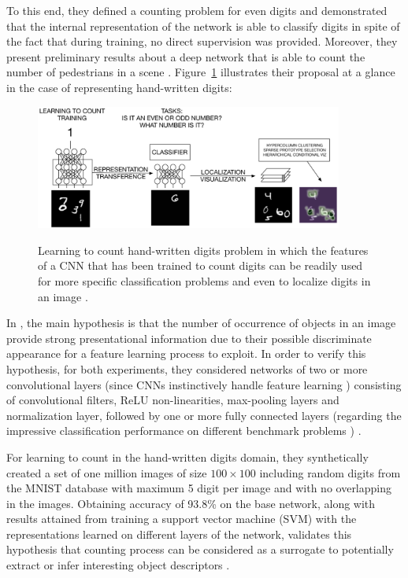 To this end, they defined a counting problem for even digits and demonstrated that the internal representation of the network is able to classify digits in spite of the fact that during training, no direct supervision was provided. Moreover, they present preliminary results about a deep network that is able to count the number of pedestrians in a scene \cite{segui2015learning}. Figure~\ref{fig:santimnist} illustrates their proposal at a glance in the case of representing hand-written digits:
\begin{figure}[H]
	\centering
	{\includegraphics[width=0.9\textwidth]{images/santimnist}}
	\caption{Learning to count hand-written digits problem in which the features of a CNN that has been trained to count digits can be readily used for more specific classification problems and even to localize digits in an image \cite{segui2015learning}.}
	\label{fig:santimnist}
\end{figure}

In \cite{segui2015learning}, the main hypothesis is that the number of occurrence of objects in an image provide strong presentational information due to their possible discriminate appearance for a feature learning process to exploit. In order to verify this hypothesis, for both experiments, they considered networks of two or more convolutional layers (since CNNs instinctively handle feature learning \cite{lecun1989backpropagation}) consisting of convolutional filters, ReLU non-linearities, max-pooling layers and normalization layer, followed by one or more fully connected layers (regarding the impressive classification performance on different benchmark problems \cite{krizhevsky2012imagenet, Karpathy_2014_CVPR, ciresan2011flexible}) \cite{segui2015learning}. 

For learning to count in the hand-written digits domain, they synthetically created a set of one million images of size $100\times100$ including random digits from the MNIST database with maximum 5 digit per image and with no overlapping in the images. Obtaining accuracy of 93.8\% on the base network, along with results attained from training a support vector machine (SVM) with the representations learned on different layers of the network, validates this hypothesis that counting process can be considered as a surrogate to potentially extract or infer interesting object descriptors \cite{segui2015learning}. 


